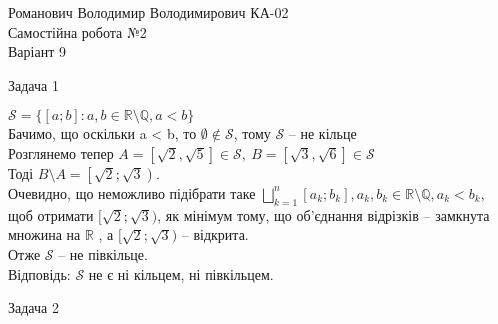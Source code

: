 \documentclass[12 pt]{article}
\begin{document}
\begin{center}
    \Large
    Романович Володимир Володимирович КА-02 \\
    Самостійна робота №2 \\ 
    Варіант 9
\end{center}
\begin{center}
    \Large 
    Задача 1
\end{center}
$\mathcal{S} = \{ [a;b] : a, b \in \mathbb{R} \setminus \mathbb{Q}, a < b \}$ \\
Бачимо, що оскільки a < b, то $\emptyset \notin \mathcal{S}$, тому $\mathcal{S}$ -- не кільце \\ 
Розглянемо тепер $A = \left[\sqrt{2}, \sqrt{5} \right] \in \mathcal{S}, 
\ B = \left[\sqrt{3}, \sqrt{6} \right] \in \mathcal{S}$ \\ 
Тоді $B \setminus A = \left[\sqrt{2}; \sqrt{3}\right)$. \\
Очевидно, що неможливо
підібрати таке $\bigsqcup_{k=1}^{n} 
[a_{k}; b_{k}], a_k, b_k \in \mathbb{R} \setminus \mathbb{Q}, a_k < b_k$, 
щоб отримати $[\sqrt{2};\sqrt{3})$, як мінімум тому, що 
об'єднання відрізків -- замкнута множина на $\mathbb{R}$ , а $[\sqrt{2};\sqrt{3})$ -- відкрита. \\ 
Отже $\mathcal{S}$ -- не півкільце. \\ 
Відповідь: $\mathcal{S}$ не є ні кільцем, ні півкільцем.
\begin{center}
    \Large 
    Задача 2
\end{center}
\end{document}
